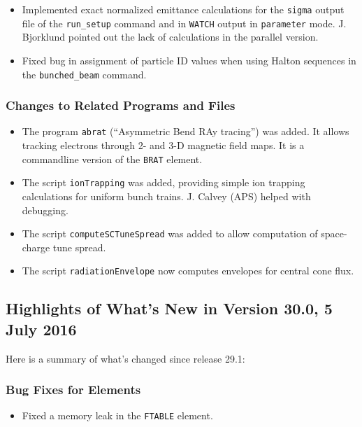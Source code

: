 \documentclass[11pt]{article}
\begin{document}
\begin{itemize}
\item Implemented exact normalized emittance calculations for the \verb|sigma| output file of the \verb|run_setup| command and in \verb|WATCH|
  output in \verb|parameter| mode. J. Bjorklund pointed out the lack of calculations in the parallel version.
\item Fixed bug in assignment of particle ID values when using Halton sequences in the \verb|bunched_beam| command.
\end{itemize}

\subsubsection{Changes to Related Programs and Files}

\begin{itemize}
\item The program \verb|abrat| (``Asymmetric Bend RAy tracing'') was added. It allows tracking electrons through 2- and 3-D magnetic field maps.
  It is a commandline version of the \verb|BRAT| element.
\item The script \verb|ionTrapping| was added, providing simple ion trapping calculations for uniform bunch trains. J. Calvey (APS) helped with
  debugging.
\item The script \verb|computeSCTuneSpread| was added to allow computation of space-charge tune spread.
\item The script \verb|radiationEnvelope| now computes envelopes for central cone flux.
\end{itemize}

\subsection{Highlights of What's New in Version 30.0, 5 July 2016}

Here is a summary of what's changed since release 29.1:

\subsubsection{Bug Fixes for Elements}

\begin{itemize}
\item Fixed a memory leak in the \verb|FTABLE| element.
\end{itemize}
\end{document}
